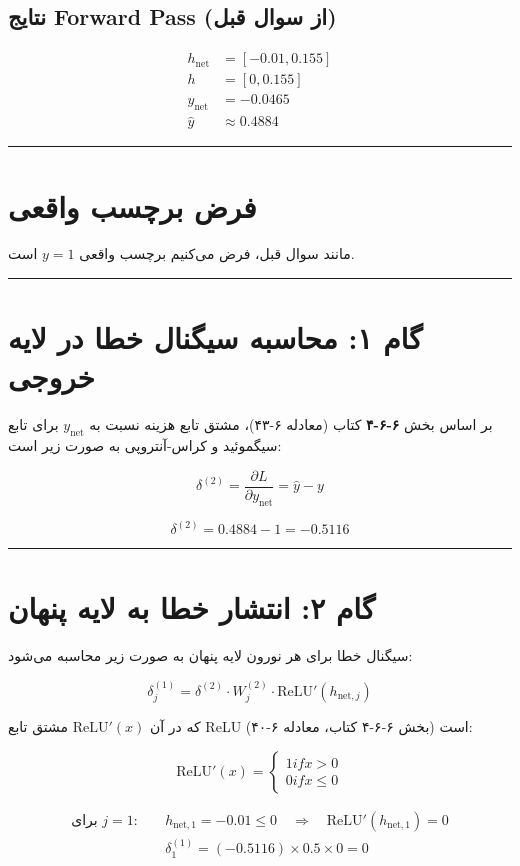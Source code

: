 \documentclass[11pt,a4paper]{article}
\newcommand{\en}[1]{\textenglish{#1}}
\newcommand{\separator}{\vspace{1em}\noindent\rule{\linewidth}{0.4pt}\vspace{1em}}
\begin{document}
\subsection{نتایج \en{Forward Pass} (از سوال قبل)}
\begin{align*}
h_{\text{net}} &= [-0.01, 0.155] \\
h &= [0, 0.155] \\
y_{\text{net}} &= -0.0465 \\
\hat{y} &\approx 0.4884
\end{align*}

\separator
\section{فرض برچسب واقعی}

مانند سوال قبل، فرض می‌کنیم برچسب واقعی \(y = 1\) است.

\separator
\section{گام ۱: محاسبه سیگنال خطا در لایه خروجی}

بر اساس بخش \textbf{\en{۶-۶-۴}} کتاب (معادله \en{۶-۴۳})، مشتق تابع هزینه نسبت به \(y_{\text{net}}\) برای تابع سیگموئید و کراس-آنتروپی به صورت زیر است:

\[
\delta^{(2)} = \frac{\partial L}{\partial y_{\text{net}}} = \hat{y} - y
\]

\[
\delta^{(2)} = 0.4884 - 1 = -0.5116
\]

\separator
\section{گام ۲: انتشار خطا به لایه پنهان}

سیگنال خطا برای هر نورون لایه پنهان به صورت زیر محاسبه می‌شود:

\[
\delta^{(1)}_j = \delta^{(2)} \cdot W^{(2)}_j \cdot \text{ReLU}'(h_{\text{net},j})
\]

که در آن \(\text{ReLU}'(x)\) مشتق تابع \en{ReLU} است (بخش \en{۶-۶-۴} کتاب، معادله \en{۶-۴۰}):

\[
\text{ReLU}'(x) = 
\begin{cases} 
1 if  x > 0 \\
0 if  x \le 0
\end{cases}
\]

\begin{align*}
\text{برای } j=1: &\quad h_{\text{net},1} = -0.01 \le 0 \quad \Rightarrow \quad \text{ReLU}'(h_{\text{net},1}) = 0 \\
&\quad \delta^{(1)}_1 = (-0.5116) \times 0.5 \times 0 = 0
\end{align*}
\end{document}
